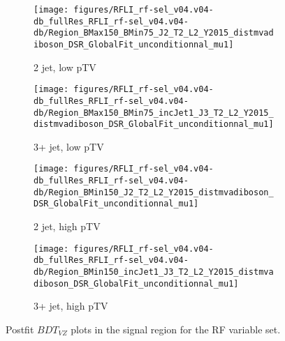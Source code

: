 \begin{figure}[!htbp]\captionsetup{justification=centering}
    \centering
\begin{subfigure}[t]{0.45000\textwidth}\centering\texttt{[image: figures/RFLI\_rf-sel\_v04.v04-db\_fullRes\_RFLI\_rf-sel\_v04.v04-db/Region\_BMax150\_BMin75\_J2\_T2\_L2\_Y2015\_distmvadiboson\_DSR\_GlobalFit\_unconditionnal\_mu1]}\caption{2 jet, low pTV}\end{subfigure}
\begin{subfigure}[t]{0.45000\textwidth}\centering\texttt{[image: figures/RFLI\_rf-sel\_v04.v04-db\_fullRes\_RFLI\_rf-sel\_v04.v04-db/Region\_BMax150\_BMin75\_incJet1\_J3\_T2\_L2\_Y2015\_distmvadiboson\_DSR\_GlobalFit\_unconditionnal\_mu1]}\caption{3+ jet, low pTV}\end{subfigure}
\begin{subfigure}[t]{0.45000\textwidth}\centering\texttt{[image: figures/RFLI\_rf-sel\_v04.v04-db\_fullRes\_RFLI\_rf-sel\_v04.v04-db/Region\_BMin150\_J2\_T2\_L2\_Y2015\_distmvadiboson\_DSR\_GlobalFit\_unconditionnal\_mu1]}\caption{2 jet, high pTV}\end{subfigure}
\begin{subfigure}[t]{0.45000\textwidth}\centering\texttt{[image: figures/RFLI\_rf-sel\_v04.v04-db\_fullRes\_RFLI\_rf-sel\_v04.v04-db/Region\_BMin150\_incJet1\_J3\_T2\_L2\_Y2015\_distmvadiboson\_DSR\_GlobalFit\_unconditionnal\_mu1]}\caption{3+ jet, high pTV}\end{subfigure}
  \caption{Postfit $BDT_{VZ}$ plots in the signal region for the RF variable set.}
  \label{fig:RFPostfitmvavz}
\end{figure}

